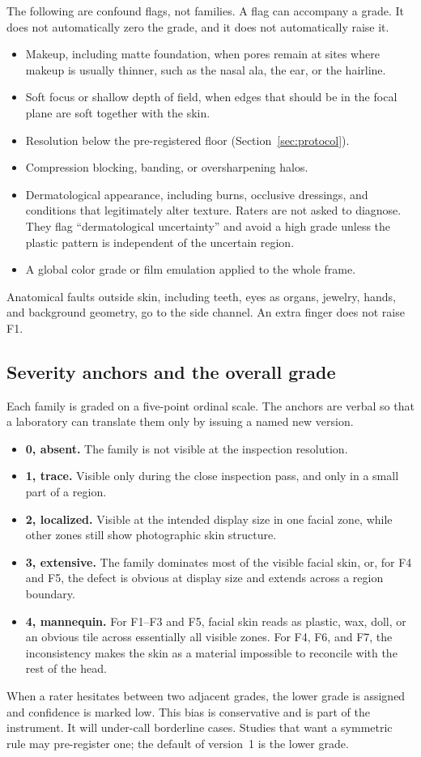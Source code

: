 \documentclass[10pt,twocolumn]{article}
\begin{document}
The following are confound flags, not families. A flag can accompany a grade. It does not automatically zero the grade, and it does not automatically raise it.
\begin{itemize}
  \item Makeup, including matte foundation, when pores remain at sites where makeup is usually thinner, such as the nasal ala, the ear, or the hairline.
  \item Soft focus or shallow depth of field, when edges that should be in the focal plane are soft together with the skin.
  \item Resolution below the pre-registered floor (Section~\ref{sec:protocol}).
  \item Compression blocking, banding, or oversharpening halos.
  \item Dermatological appearance, including burns, occlusive dressings, and conditions that legitimately alter texture. Raters are not asked to diagnose. They flag ``dermatological uncertainty'' and avoid a high grade unless the plastic pattern is independent of the uncertain region.
  \item A global color grade or film emulation applied to the whole frame.
\end{itemize}
Anatomical faults outside skin, including teeth, eyes as organs, jewelry, hands, and background geometry, go to the side channel. An extra finger does not raise F1.

\subsection{Severity anchors and the overall grade}

Each family is graded on a five-point ordinal scale. The anchors are verbal so that a laboratory can translate them only by issuing a named new version.
\begin{itemize}
  \item \textbf{0, absent.} The family is not visible at the inspection resolution.
  \item \textbf{1, trace.} Visible only during the close inspection pass, and only in a small part of a region.
  \item \textbf{2, localized.} Visible at the intended display size in one facial zone, while other zones still show photographic skin structure.
  \item \textbf{3, extensive.} The family dominates most of the visible facial skin, or, for F4 and F5, the defect is obvious at display size and extends across a region boundary.
  \item \textbf{4, mannequin.} For F1--F3 and F5, facial skin reads as plastic, wax, doll, or an obvious tile across essentially all visible zones. For F4, F6, and F7, the inconsistency makes the skin as a material impossible to reconcile with the rest of the head.
\end{itemize}
When a rater hesitates between two adjacent grades, the lower grade is assigned and confidence is marked low. This bias is conservative and is part of the instrument. It will under-call borderline cases. Studies that want a symmetric rule may pre-register one; the default of version~1 is the lower grade.
\end{document}
